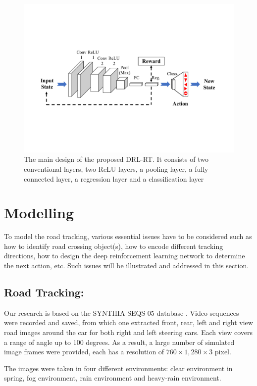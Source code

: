 \documentclass[conference]{IEEEtran}
\begin{document}
	\begin{figure}[!h]
		\centering
		\includegraphics[scale=.65,trim=2cm 5.5cm 2cm 5.5cm,clip]{Deep_Reinf_Net1.pdf}
		\caption{The main design of the proposed DRL-RT. It consists of two conventional layers, two ReLU layers, a pooling layer, a fully connected layer, a regression layer and a classification layer}
		\label{Fig:Deep_Reinf_Net}
	\end{figure}
	\section{Modelling}
		To model the road tracking, various essential issues have to be considered such as how to identify road crossing object(s), how to encode different tracking directions, how to design the deep reinforcement learning network to determine the next action, etc. Such issues will be illustrated and addressed in this section.

	\subsection{Road Tracking:} 
		Our research is based on the SYNTHIA-SEQS-05 database \cite{Ros2016TheSYNTHIA}. Video sequences were recorded and saved, from which one extracted front,  rear, left and right view road images around the car for both right and left steering cars. Each view covers a range of angle up to 100 degrees. As a result, a large number of simulated image frames were provided, each has a resolution of $760 \times 1,280 \times 3$ pixel. 
		
		The images were taken in four different environments: clear
		environment in spring, fog environment, rain environment and
		heavy-rain environment.
		
\end{document}
